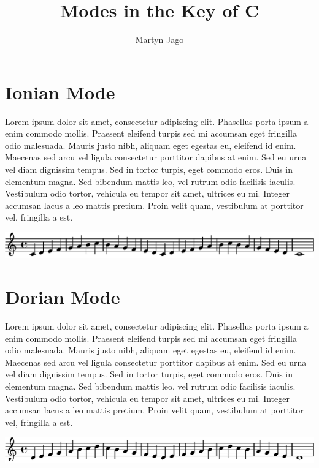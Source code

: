 \documentclass[11pt]{article}
\title{Modes in the Key of C}
\author{Martyn Jago}
\date{}
\begin{document}
\maketitle




\section*{Ionian Mode}
\label{sec-1}


Lorem ipsum dolor sit amet, consectetur adipiscing elit. Phasellus porta ipsum a enim commodo mollis. Praesent eleifend turpis sed mi accumsan eget fringilla odio malesuada. Mauris justo nibh, aliquam eget egestas eu, eleifend id enim. Maecenas sed arcu vel ligula consectetur porttitor dapibus at enim. Sed eu urna vel diam dignissim tempus. Sed in tortor turpis, eget commodo eros. Duis in elementum magna. Sed bibendum mattis leo, vel rutrum odio facilisis iaculis. Vestibulum odio tortor, vehicula eu tempor sit amet, ultrices eu mi. Integer accumsan lacus a leo mattis pretium. Proin velit quam, vestibulum at porttitor vel, fringilla a est.
\linebreak


\includegraphics[width=17cm]{ionian.eps}
\section*{Dorian Mode}
\label{sec-2}

Lorem ipsum dolor sit amet, consectetur adipiscing elit. Phasellus porta ipsum a enim commodo mollis. Praesent eleifend turpis sed mi accumsan eget fringilla odio malesuada. Mauris justo nibh, aliquam eget egestas eu, eleifend id enim. Maecenas sed arcu vel ligula consectetur porttitor dapibus at enim. Sed eu urna vel diam dignissim tempus. Sed in tortor turpis, eget commodo eros. Duis in elementum magna. Sed bibendum mattis leo, vel rutrum odio facilisis iaculis. Vestibulum odio tortor, vehicula eu tempor sit amet, ultrices eu mi. Integer accumsan lacus a leo mattis pretium. Proin velit quam, vestibulum at porttitor vel, fringilla a est.
\linebreak


\includegraphics[width=17cm]{dorian.eps}
\end{document}
